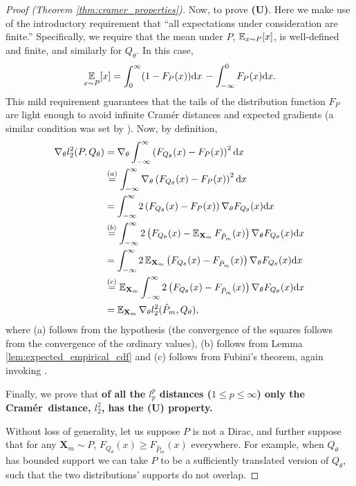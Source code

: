 \documentclass{article}
\def \ldive {l}
\def \cramer {Cram{\'e}r}
\def \dx {\textrm{d} x}
\def \Qtheta {Q_\theta}
\def \gradtheta {{\grad_\theta}}
\def \batch {\mathbf{X}_m}
\begin{document}
\begin{proof}[Proof (Theorem \ref{thm:cramer_properties})]
Now, to prove \textbf{(U)}. Here we make use of the introductory requirement that ``all expectations under consideration are finite.'' Specifically, we require that the mean under $P$, $\expect_{x \sim P} [x]$, is well-defined and finite, and similarly for $\Qtheta$. In this case,
\begin{equation}
\expect_{x \sim P} [x] = \int_0^\infty (1 - F_P(x)) \dx \, - \int_{-\infty}^0 F_P(x) \dx .\label{eqn:light_tails}
\end{equation}
This mild requirement guarantees that the tails of the distribution function $F_P$ are light enough to avoid infinite Cram\'er distances and expected gradients (a similar condition was set by \citet{dedecker07empirical}). Now, by definition,
\begin{align*}
\gradtheta \ldive_2^2(P, \Qtheta) &= \gradtheta \int_{-\infty}^{\infty} \left ( F_{\Qtheta}(x) - F_P(x) \right )^2 \dx \\
&\overset{(a)}{=} \int_{-\infty}^{\infty} \gradtheta \left ( F_{\Qtheta}(x) - F_P(x) \right )^2 \dx \\
&= \int_{-\infty}^{\infty} 2 \left ( F_{\Qtheta}(x) - F_P(x) \right ) \gradtheta F_{\Qtheta}(x) \dx \\
&\overset{(b)}{=} \int_{-\infty}^{\infty} 2 \left ( F_{\Qtheta}(x) - \expects_{\batch} F_{\hat P_m}(x) \right ) \gradtheta F_{\Qtheta}(x) \dx \\
&= \int_{-\infty}^{\infty} 2 \expects_{\batch} \left ( F_{\Qtheta}(x) - F_{\hat P_m}(x) \right ) \gradtheta F_{\Qtheta}(x) \dx \\
&\overset{(c)}{=} \expects_{\batch} \int_{-\infty}^{\infty} 2 \left ( F_{\Qtheta}(x) - F_{\hat P_m}(x) \right ) \gradtheta F_{\Qtheta}(x) \dx \\
&= \expects_{\batch} \gradtheta \ldive_2^2(\hat P_m, \Qtheta),
\end{align*}
where (a) follows from the hypothesis  (the convergence of the squares follows from the convergence of the ordinary values), (b) follows from Lemma \ref{lem:expected_empirical_cdf} and (c) follows from Fubini's theorem, again invoking .

Finally, we prove that \textbf{of all the $\ldive_p^p$ distances ($1 \le p \le \infty$) only the \cramer\ distance, $l_2^2$, has the (U) property.}

Without loss of generality, let us suppose $P$ is not a Dirac, and further suppose that for any $\batch \sim P$, $F_{Q_\theta}(x) \ge F_{\hat P_m}(x)$ everywhere. For example, when ${Q_\theta}$ has bounded support we can take $P$ to be a sufficiently translated version of ${Q_\theta}$, such that the two distributions' supports do not overlap.


\end{proof}
\end{document}

